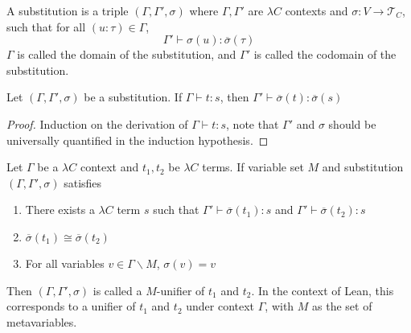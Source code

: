 \begin{definition} A substitution is a triple $(\Gamma, \Gamma', \sigma)$ where $\Gamma, \Gamma'$ are $\lambda C$ contexts
  and $\sigma : V \to \mathcal{T}_C$, such that for all $(u : \tau) \in \Gamma$,
  $$\Gamma' \vdash \sigma(u) : \overline{\sigma}(\tau)$$
  $\Gamma$ is called the domain of the substitution, and $\Gamma'$ is called the codomain of the substitution.
\end{definition}

\begin{theorem}
  Let $(\Gamma, \Gamma', \sigma)$ be a substitution. If $\Gamma \vdash t : s$, then $\Gamma' \vdash \overline{\sigma}(t) : \overline{\sigma}(s)$
\end{theorem}
\begin{proof} Induction on the derivation of $\Gamma \vdash t : s$, note that $\Gamma'$ and $\sigma$
  should be universally quantified in the induction hypothesis.
\end{proof}

\begin{definition} Let $\Gamma$ be a $\lambda C$ context and $t_1, t_2$ be $\lambda C$ terms.
  If variable set $M$ and substitution $(\Gamma, \Gamma', \sigma)$ satisfies
  \begin{enumerate}
    \item There exists a $\lambda C$ term $s$ such that $\Gamma' \vdash \overline{\sigma}(t_1) : s$ and $\Gamma' \vdash \overline{\sigma}(t_2) : s$
    \item $\overline{\sigma}(t_1) \cong \overline{\sigma}(t_2)$
    \item For all variables $v \in \Gamma \backslash M$, $\sigma(v) = v$
  \end{enumerate}
  Then $(\Gamma, \Gamma', \sigma)$ is called a $M$-unifier of $t_1$ and $t_2$. In the context of Lean,
  this corresponds to a unifier of $t_1$ and $t_2$ under context $\Gamma$, with $M$ as the set of metavariables.
\end{definition}

